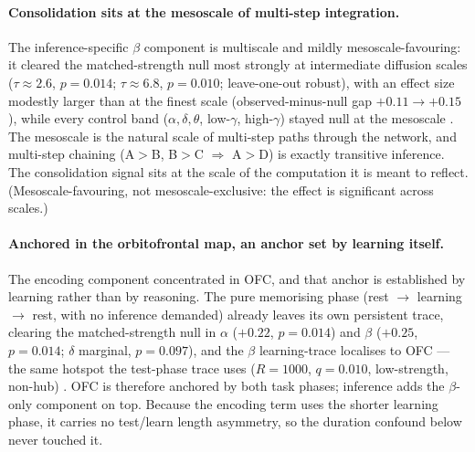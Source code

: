 \documentclass[11pt]{article}
\begin{document}
\paragraph{Consolidation sits at the mesoscale of multi-step integration.}
The inference-specific $\beta$ component is multiscale and mildly
mesoscale-favouring: it cleared the matched-strength null most strongly at
intermediate diffusion scales ($\tau\approx2.6$, $p=0.014$; $\tau\approx6.8$,
$p=0.010$; leave-one-out robust), with an effect size modestly larger than at the
finest scale (observed-minus-null gap $+0.11\rightarrow+0.15$), while every
control band ($\alpha,\delta,\theta$, low-$\gamma$, high-$\gamma$) stayed null at
the mesoscale
. The mesoscale is the natural scale of multi-step paths through the network, and
multi-step chaining (A$>$B, B$>$C $\Rightarrow$ A$>$D) is exactly transitive
inference. The consolidation signal sits at the scale of the computation it is
meant to reflect. (Mesoscale-favouring, not mesoscale-exclusive: the effect is
significant across scales.)

\paragraph{Anchored in the orbitofrontal map, an anchor set by learning itself.}
The encoding component concentrated in OFC, and that anchor is established by
learning rather than by reasoning. The pure memorising phase
(rest $\rightarrow$ learning $\rightarrow$ rest, with no inference demanded)
already leaves its own persistent trace, clearing the matched-strength null in
$\alpha$ ($+0.22$, $p=0.014$) and $\beta$ ($+0.25$, $p=0.014$; $\delta$ marginal,
$p=0.097$), and the $\beta$ learning-trace localises to OFC --- the same hotspot
the test-phase trace uses ($R=1000$, $q=0.010$, low-strength, non-hub)
. OFC is therefore anchored by both task phases; inference adds the $\beta$-only
component on top. Because the encoding term uses the shorter learning phase, it
carries no test/learn length asymmetry, so the duration confound below never
touched it.
\end{document}
